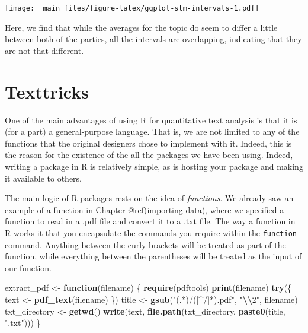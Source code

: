\documentclass[
]{book}
\newenvironment{Shaded}{\begin{snugshade}}{\end{snugshade}}
\newcommand{\ControlFlowTok}[1]{\textcolor[rgb]{0.13,0.29,0.53}{\textbf{#1}}}
\newcommand{\FunctionTok}[1]{\textcolor[rgb]{0.13,0.29,0.53}{\textbf{#1}}}
\newcommand{\NormalTok}[1]{#1}
\newcommand{\OtherTok}[1]{\textcolor[rgb]{0.56,0.35,0.01}{#1}}
\newcommand{\SpecialCharTok}[1]{\textcolor[rgb]{0.81,0.36,0.00}{\textbf{#1}}}
\newcommand{\StringTok}[1]{\textcolor[rgb]{0.31,0.60,0.02}{#1}}
\begin{document}
\texttt{[image: \_main\_files/figure-latex/ggplot-stm-intervals-1.pdf]}

Here, we find that while the averages for the topic do seem to differ a little between both of the parties, all the intervals are overlapping, indicating that they are not that different.

\chapter{Texttricks}\label{texttricks}

One of the main advantages of using R for quantitative text analysis is that it is (for a part) a general-purpose language. That is, we are not limited to any of the functions that the original designers chose to implement with it. Indeed, this is the reason for the existence of the all the packages we have been using. Indeed, writing a package in R is relatively simple, as is hosting your package and making it available to others.

The main logic of R packages rests on the idea of \emph{functions}. We already saw an example of a function in Chapter @ref(importing-data), where we specified a function to read in a .pdf file and convert it to a .txt file. The way a function in R works it that you encapsulate the commands you require within the \texttt{function} command. Anything between the curly brackets will be treated as part of the function, while everything between the parentheses will be treated as the input of our function.

\begin{Shaded}
\begin{Highlighting}[]
\NormalTok{extract\_pdf }\OtherTok{\textless{}{-}} \ControlFlowTok{function}\NormalTok{(filename) \{}
  \FunctionTok{require}\NormalTok{(pdftools)}
  \FunctionTok{print}\NormalTok{(filename)}
  \FunctionTok{try}\NormalTok{(\{}
\NormalTok{    text }\OtherTok{\textless{}{-}} \FunctionTok{pdf\_text}\NormalTok{(filename)}
\NormalTok{  \})}
\NormalTok{  title }\OtherTok{\textless{}{-}} \FunctionTok{gsub}\NormalTok{(}\StringTok{"(.*)/([\^{}/]*).pdf"}\NormalTok{, }\StringTok{"}\SpecialCharTok{\textbackslash{}\textbackslash{}}\StringTok{2"}\NormalTok{, filename)}
\NormalTok{  txt\_directory }\OtherTok{\textless{}{-}} \FunctionTok{getwd}\NormalTok{()}
  \FunctionTok{write}\NormalTok{(text, }\FunctionTok{file.path}\NormalTok{(txt\_directory, }\FunctionTok{paste0}\NormalTok{(title, }\StringTok{".txt"}\NormalTok{)))}
\NormalTok{\}}
\end{Highlighting}
\end{Shaded}
\end{document}
